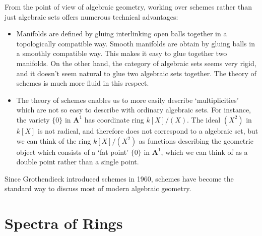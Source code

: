 From the point of view of algebraic geometry, working over schemes rather than just algebraic sets offers numerous technical advantages:
%
\begin{itemize}
    \item Manifolds are defined by gluing interlinking open balls together in a topologically compatible way. Smooth manifolds are obtain by gluing balls in a smoothly compatible way. This makes it easy to glue together two manifolds. On the other hand, the category of algebraic sets seems very rigid, and it doesn't seem natural to glue two algebraic sets together. The theory of schemes is much more fluid in this respect.

    \item The theory of schemes enables us to more easily describe `multiplicities' which are not so easy to describe with ordinary algebraic sets. For instance, the variety $\{ 0 \}$ in $\mathbf{A}^1$ has coordinate ring $k[X]/(X)$. The ideal $(X^2)$ in $k[X]$ is not radical, and therefore does not correspond to a algebraic set, but we can think of the ring $k[X]/(X^2)$ as functions describing the geometric object which consists of a `fat point' $\{ 0 \}$ in $\mathbf{A}^1$, which we can think of as a double point rather than a single point.
\end{itemize}
%
Since Grothendieck introduced schemes in 1960, schemes have become the standard way to discuss most of modern algebraic geometry.

\section{Spectra of Rings}

